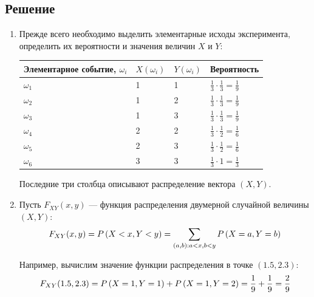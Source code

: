 \documentclass[12pt,a4paper]{article}
\begin{document}
    \subsection*{Решение}
    \begin{enumerate}
        \item Прежде всего необходимо выделить элементарные исходы эксперимента, определить их вероятности и значения величин $X$ и $Y$:

        \begin{tabular}{|p{5cm}|p{1cm}|p{1cm}|p{3cm}|}
            \hline
            Элементарное событие, $\omega_i$ & $X \left ( \omega_i \right )$ & $Y \left ( \omega_i \right )$
            & Вероятность
            \\
            \hline
            \hline
            $\omega_1$ & 1 & 1 & $\frac{1}{3} \cdot \frac{1}{3} = \frac{1}{9}$ \\
            \hline
            $\omega_2$ & 1 & 2 & $\frac{1}{3} \cdot \frac{1}{3} = \frac{1}{9}$ \\
            \hline
            $\omega_3$ & 1 & 3 & $\frac{1}{3} \cdot \frac{1}{3} = \frac{1}{9}$ \\
            \hline
            $\omega_4$ & 2 & 2 & $\frac{1}{3} \cdot \frac{1}{2} = \frac{1}{6}$ \\
            \hline
            $\omega_5$ & 2 & 3 & $\frac{1}{3} \cdot \frac{1}{2} = \frac{1}{6}$ \\
            \hline
            $\omega_6$ & 3 & 3 & $\frac{1}{3} \cdot 1 = \frac{1}{3}$           \\
            \hline
        \end{tabular}

        Последние три столбца описывают распределение вектора $\left ( X, Y \right )$.

        \item Пусть $F_{XY}(x, y)$ --- функция распределения двумерной случайной величины $(X, Y)$:
        \begin{equation}
            F_{XY}(x, y)
            = P \left ( X < x, Y < y \right )
            = \sum_{(a, b) : a < x, b < y} P \left ( X=a, Y=b \right )
        \end{equation}

        Например, вычислим значение функции распределения в точке $\left (1.5, 2.3 \right )$:
        \begin{equation}
            F_{XY}(1.5, 2.3) = P \left ( X=1, Y=1 \right ) + P \left ( X=1, Y=2 \right ) = \frac{1}{9} + \frac{1}{9} = \frac{2}{9}
        \end{equation}


\end{enumerate}
\end{document}

